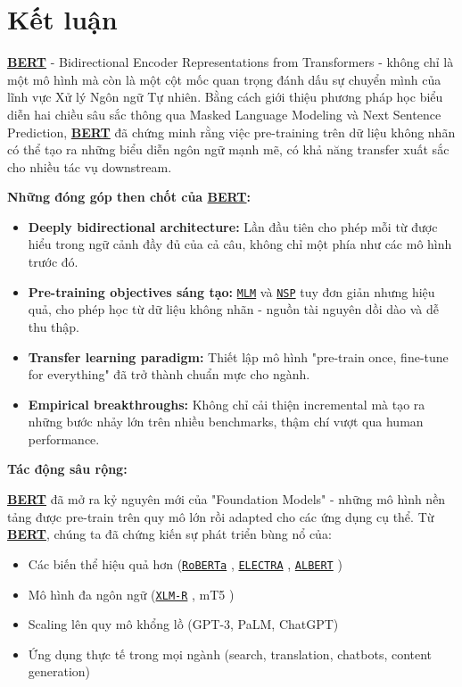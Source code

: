 \section{Kết luận}
\label{sec:ket_luan}
\hyperref[acro:bert]{\textbf{BERT}} - Bidirectional Encoder Representations from Transformers \cite{devlin2018bert} - không chỉ là một mô hình mà còn là một cột mốc quan trọng đánh dấu sự chuyển mình của lĩnh vực Xử
lý Ngôn ngữ Tự nhiên. Bằng cách giới thiệu phương pháp học biểu diễn hai chiều sâu sắc thông qua Masked Language Modeling và Next Sentence Prediction, \hyperref[acro:bert]{\textbf{BERT}} đã chứng minh rằng việc pre-training trên dữ liệu không nhãn có thể tạo ra những biểu diễn ngôn ngữ mạnh mẽ, có khả năng transfer xuất sắc cho nhiều tác vụ downstream.


\textbf{Những đóng góp then chốt của \hyperref[acro:bert]{\textbf{BERT}}:}
\begin{itemize}
    \item \textbf{Deeply bidirectional architecture:} Lần đầu tiên cho phép mỗi từ được hiểu trong ngữ cảnh đầy đủ của cả câu, không chỉ một phía như các mô hình trước đó.
    \item \textbf{Pre-training objectives sáng tạo:} \hyperref[acro:mlm]{\texttt{MLM}} và \hyperref[acro:nsp]{\texttt{NSP}} tuy đơn giản nhưng hiệu quả, cho phép học từ dữ liệu không nhãn - nguồn tài nguyên dồi dào và dễ thu thập.
    \item \textbf{Transfer learning paradigm:} Thiết lập mô hình "pre-train once, fine-tune for everything" đã trở thành chuẩn mực cho ngành.
    \item \textbf{Empirical breakthroughs:} Không chỉ cải thiện incremental mà tạo ra những bước nhảy lớn trên nhiều benchmarks, thậm chí vượt qua human performance.
\end{itemize}

\textbf{Tác động sâu rộng:}

\hyperref[acro:bert]{\textbf{BERT}} đã mở ra kỷ nguyên mới của "Foundation Models" - những mô hình nền tảng được pre-train trên quy mô lớn rồi adapted cho các ứng dụng cụ thể.
Từ \hyperref[acro:bert]{\textbf{BERT}}, chúng ta đã chứng kiến sự phát triển bùng nổ của:
\begin{itemize}
    \item Các biến thể hiệu quả hơn (\hyperref[acro:roberta]{\texttt{RoBERTa}} \cite{liu2019roberta}, \hyperref[acro:electra]{\texttt{ELECTRA}} \cite{clark2020electra}, \hyperref[acro:albert]{\texttt{ALBERT}} \cite{lan2019albert})
    \item Mô hình đa ngôn ngữ (\hyperref[acro:xlm-r]{\texttt{XLM-R}} \cite{conneau2019unsupervised}, mT5 \cite{raffel2020exploring})
    \item Scaling lên quy mô khổng lồ (GPT-3, PaLM, ChatGPT)
    \item Ứng dụng thực tế trong mọi ngành (search, translation, chatbots, content generation)
\end{itemize}

